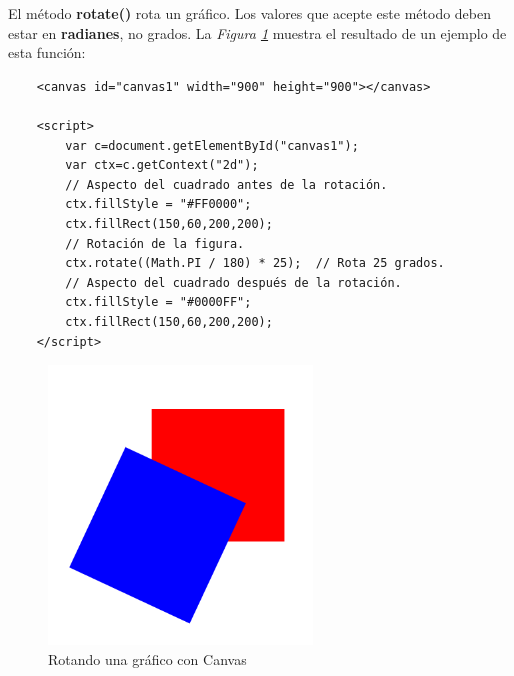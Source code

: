El método \textbf{rotate()} rota un gráfico. Los valores que acepte este método deben estar en \textbf{radianes}, no grados. La \textit{Figura \ref{fig: 29}} muestra el resultado de un ejemplo de esta función:
\begin{lstlisting}
    <canvas id="canvas1" width="900" height="900"></canvas> 
            
    <script>
        var c=document.getElementById("canvas1");
        var ctx=c.getContext("2d");
        // Aspecto del cuadrado antes de la rotación.
        ctx.fillStyle = "#FF0000";
        ctx.fillRect(150,60,200,200);
        // Rotación de la figura.
        ctx.rotate((Math.PI / 180) * 25);  // Rota 25 grados.
        // Aspecto del cuadrado después de la rotación.
        ctx.fillStyle = "#0000FF";
        ctx.fillRect(150,60,200,200);
    </script>
\end{lstlisting}
\begin{figure}[H]
    \centering
    \caption{Rotando una gráfico con Canvas}
    \label{fig: 29}
    \includegraphics[width=7cm]{ss_html/canvas_rotate.png}
\end{figure}

